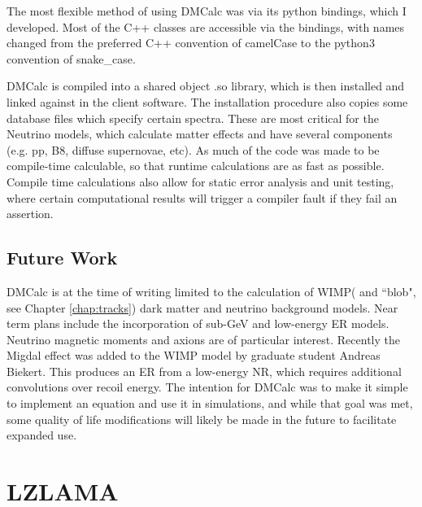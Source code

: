 The most flexible method of using DMCalc was via its python bindings, which I developed.
Most of the C++ classes are accessible via the bindings, with names changed from the preferred C++ convention of camelCase to the python3 convention of snake\_case.


DMCalc is compiled into a shared object .so library, which is then installed and linked against in the client software. 
The installation procedure also copies some database files which specify certain spectra. 
These are most critical for the Neutrino models, which calculate matter effects and have several components (e.g. pp, B8, diffuse supernovae, etc).
As much of the code was made to be compile-time calculable, so that runtime calculations are as fast as possible.
Compile time calculations also allow for static error analysis and unit testing, where certain computational results will trigger a compiler fault if they fail an assertion.

\subsection{Future Work}

DMCalc is at the time of writing limited to the calculation of WIMP( and ``blob", see Chapter \ref{chap:tracks}) dark matter and neutrino background models.
Near term plans include the incorporation of sub-GeV and low-energy ER models.
Neutrino magnetic moments and axions are of particular interest.
Recently the Migdal effect\cite{ibe_migdal_2018} was added to the WIMP model by graduate student Andreas Biekert.
This produces an ER from a low-energy NR, which requires additional convolutions over recoil energy.
The intention for DMCalc was to make it simple to implement an equation and use it in simulations, and while that goal was met, some quality of life modifications will likely be made in the future to facilitate expanded use.

\section{LZLAMA}
